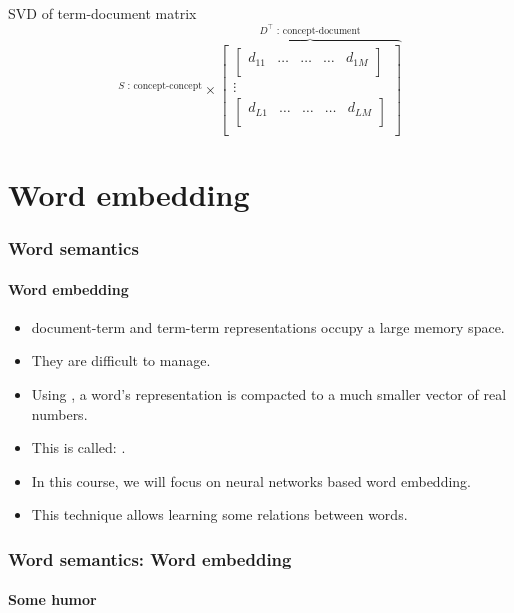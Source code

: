 \documentclass[xcolor=table]{beamer}
\begin{document}
\begin{frame}
\begin{block}{SVD of term-document matrix}
\[{		}^{S \text{ : concept-concept}}
		\times 
		\overbrace{
			\begin{bmatrix}
			\begin{bmatrix}
			d_{11} & \ldots & \ldots & \ldots & d_{1M} \\
			\end{bmatrix}\\
			\vdots \\
			\begin{bmatrix}
			d_{L1} & \ldots & \ldots & \ldots & d_{LM} \\
			\end{bmatrix}\\
			\end{bmatrix}
		}^{D^\top \text{ : concept-document}}
		\]
		
	\end{block}
	
\end{frame}


\section{Word embedding}

\begin{frame}
\frametitle{Word semantics}
\framesubtitle{Word embedding}

\begin{itemize}
	\item document-term and term-term representations occupy a large memory space.
	\item They are difficult to manage. 
	\item Using , a word's representation is compacted to a much smaller vector of real numbers.
	\item This is called: .
	\item In this course, we will focus on neural networks based word embedding.
	\item This technique allows learning some relations between words.
\end{itemize}

\end{frame}


\begin{frame}
\frametitle{Word semantics: Word embedding}
\framesubtitle{Some humor}
\begin{center}
\end{center}
\end{frame}
\end{document}
